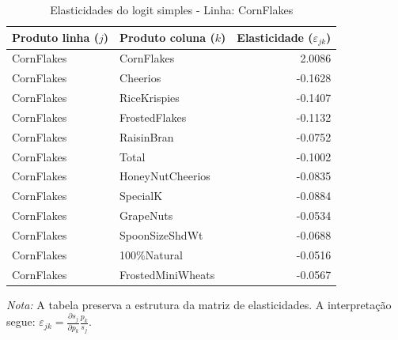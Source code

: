 

\begingroup
\begin{table}[H]
\centering
\caption{Elasticidades do logit simples - Linha: CornFlakes}
\label{tab:elas-cornflakes}
\small
\begin{tabular}{llr}
\toprule
Produto linha ($j$) & Produto coluna ($k$) & Elasticidade ($\varepsilon_{jk}$) \\
\midrule
CornFlakes & CornFlakes & 2.0086 \\
CornFlakes & Cheerios & -0.1628 \\
CornFlakes & RiceKrispies & -0.1407 \\
CornFlakes & FrostedFlakes & -0.1132 \\
CornFlakes & RaisinBran & -0.0752 \\
CornFlakes & Total & -0.1002 \\
CornFlakes & HoneyNutCheerios & -0.0835 \\
CornFlakes & SpecialK & -0.0884 \\
CornFlakes & GrapeNuts & -0.0534 \\
CornFlakes & SpoonSizeShdWt & -0.0688 \\
CornFlakes & 100\%Natural & -0.0516 \\
CornFlakes & FrostedMiniWheats & -0.0567 \\
\bottomrule
\end{tabular}

\vspace{0.3em}
\footnotesize
\textit{Nota:} A tabela preserva a estrutura da matriz de elasticidades. A interpretação segue: $\varepsilon_{jk}=\frac{\partial s_j}{\partial p_k}\frac{p_k}{s_j}$.
\end{table}
\endgroup


